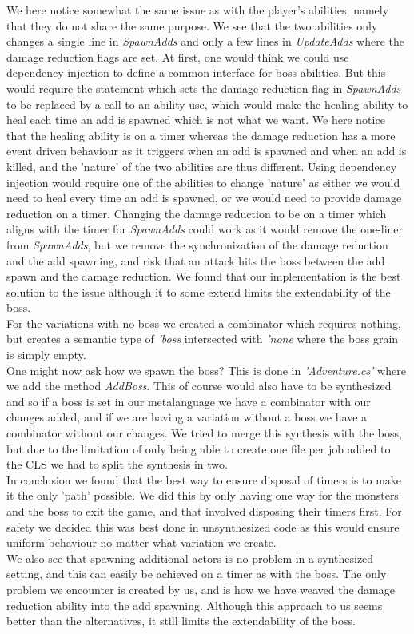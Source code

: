 We here notice somewhat the same issue as with the player's abilities, namely that they do not share the same purpose. We see that the two abilities only changes a single line in \textit{SpawnAdds} and only a few lines in \textit{UpdateAdds} where the damage reduction flags are set. At first, one would think we could use dependency injection to define a common interface for boss abilities. But this would require the statement which sets the damage reduction flag in \textit{SpawnAdds} to be replaced by a call to an ability use, which would make the healing ability to heal each time an add is spawned which is not what we want. We here notice that the healing ability is on a timer whereas the damage reduction has a more event driven behaviour as it triggers when an add is spawned and when an add is killed, and the 'nature' of the two abilities are thus different. Using dependency injection would require one of the abilities to change 'nature' as either we would need to heal every time an add is spawned, or we would need to provide damage reduction on a timer. Changing the damage reduction to be on a timer which aligns with the timer for \textit{SpawnAdds} could work as it would remove the one-liner from \textit{SpawnAdds}, but we remove the synchronization of the damage reduction and the add spawning, and risk that an attack hits the boss between the add spawn and the damage reduction. We found that our implementation is the best solution to the issue although it to some extend limits the extendability of the boss.\\
For the variations with no boss we created a combinator which requires nothing, but creates a semantic type of \textit{'boss} intersected with \textit{'none} where the boss grain is simply empty.\\

One might now ask how we spawn the boss? This is done in \textit{'Adventure.cs'} where we add the method \textit{AddBoss}. This of course would also have to be synthesized and so if a boss is set in our metalanguage we have a combinator with our changes added, and if we are having a variation without a boss we have a combinator without our changes. We tried to merge this synthesis with the boss, but due to the limitation of only being able to create one file per job added to the CLS we had to split the synthesis in two.\\

In conclusion we found that the best way to ensure disposal of timers is to make it the only 'path' possible. We did this by only having one way for the monsters and the boss to exit the game, and that involved disposing their timers first. For safety we decided this was best done in unsynthesized code as this would ensure uniform behaviour no matter what variation we create.\\
We also see that spawning additional actors is no problem in a synthesized setting, and this can easily be achieved on a timer as with the boss. The only problem we encounter is created by us, and is how we have weaved the damage reduction ability into the add spawning. Although this approach to us seems better than the alternatives, it still limits the extendability of the boss.